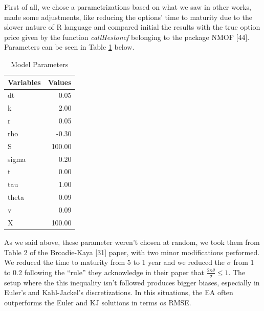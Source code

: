 \documentclass[12pt,twoside]{reedthesis}
\theoremstyle{definition}
\theoremstyle{definition}
\theoremstyle{remark}
\begin{document}
  First of all, we chose a parametrizations based on what we saw in other
  works, made some adjustments, like reducing the options' time to
  maturity due to the slower nature of R language and compared initial the
  results with the true option price given by the function
  \emph{callHestoncf} belonging to the package NMOF {[}44{]}. Parameters
  can be seen in Table \ref{param} below.
  \begin{table}[ht]
  \centering
  \begingroup\fontsize{9pt}{11pt}\selectfont
  \begin{tabular}{lr}
    \hline 
  Variables & Values \\ 
    \hline 
  dt & 0.05 \\ 
    k & 2.00 \\ 
    r & 0.05 \\ 
    rho & -0.30 \\ 
    S & 100.00 \\ 
    sigma & 0.20 \\ 
    t & 0.00 \\ 
    tau & 1.00 \\ 
    theta & 0.09 \\ 
    v & 0.09 \\ 
    X & 100.00 \\ 
     \hline 
  \end{tabular}
  \endgroup
  \caption{Model Parameters} 
  \label{param}
  \end{table}
  As we said above, these parameter weren't chosen at random, we took them
  from Table 2 of the Broadie-Kaya {[}31{]} paper, with two minor
  modifications performed. We reduced the time to maturity from 5 to 1
  year and we reduced the \(\sigma\) from 1 to 0.2 following the ``rule''
  they acknowledge in their paper that
  \(\frac{2 \kappa \theta}{\sigma} \leq 1\). The setup where the this
  inequality isn't followed produces bigger biases, especially in Euler's
  and Kahl-Jackel's discretizations. In this situations, the EA often
  outperforms the Euler and KJ solutions in terms os RMSE.
  
  \clearpage
  
\end{document}
